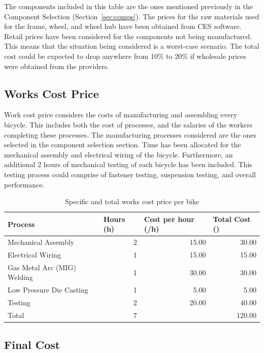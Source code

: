 \documentclass[a4paper,11pt]{article}
\begin{document}
The components included in this table are the ones mentioned previously in the Component Selection (Section~\ref{sec:comps}). The prices for the raw materials used for the frame, wheel, and wheel hub have been obtained from CES software. Retail prices have been considered for the components not being manufactured. This means that the situation being considered is a worst-case scenario. The total cost could be expected to drop anywhere from 10\% to 20\% if wholesale prices were obtained from the providers. 

\subsection{Works Cost Price}

Work cost price considers the costs of manufacturing and assembling every bicycle. This includes both the cost of processes, and the salaries of the workers completing these processes. The manufacturing processes considered are the ones selected in the component selection section. Time has been allocated for the mechanical assembly and electrical wiring of the bicycle. Furthermore, an additional 2 hours of mechanical testing of each bicycle has been included. This testing process could comprise of fastener testing, suspension testing, and overall performance. 

\begin{table}[!ht]
	\centering
	\caption{Specific and total works cost price per bike}
	\begin{tabular}{l r r r}
		\hline
		\multicolumn{1}{l}{Process}&\multicolumn{1}{l}{Hours (h)}&\multicolumn{1}{l}{Cost per hour (\textsterling/h)}&\multicolumn{1}{l}{Total Cost (\textsterling)}\\\hline
		Mechanical Assembly&2&15.00&30.00\\
		Electrical Wiring&1&15.00&15.00\\
		Gas Metal Arc (MIG) Welding&1&30.00&30.00\\
		Low Pressure Die Casting&1&5.00&5.00\\
		Testing&2&20.00&40.00\\\hline
		Total&7&&120.00\\\hline
	\end{tabular}
\end{table}

\subsection{Final Cost}
\end{document}
